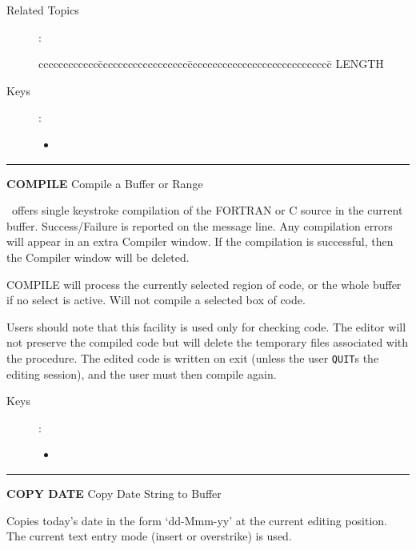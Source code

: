 \begin{description}
\item[Related Topics]:
\begin{tabbing}
cccccccccccc\=cccccccccccccccccc\=ccccccccccccccccccccccccccccc\=\kill
 \> LENGTH \\
\end{tabbing}

\item[Keys]:
           \begin{itemize}
           \item \gold\ 
           \end{itemize}
\end{description}

\goodbreak

\rule{\textwidth}{0.3mm}

{\Large {\bf COMPILE} \hfill Compile a Buffer or Range}

\medskip
  \STEve\ offers single keystroke compilation of the FORTRAN or C source
  in the current buffer. Success/Failure is reported on the message
  line. Any compilation errors will appear in an extra Compiler
  window. If the compilation is successful, then the Compiler
  window will be deleted.

  COMPILE will process the currently selected region of code, or the
  whole buffer if no select is active. Will not compile a selected box
  of code.

  Users should note that this facility is used only for checking code. The
  editor will not preserve the compiled code but will delete the temporary
  files associated with the procedure. The edited code is written
  on exit (unless the user {\tt QUIT}s the editing session), and the user
  must then compile again.

\begin{description}
\item[Keys]:
          \begin{itemize}
          \item {}\ 
          \end{itemize}
\end{description}

\goodbreak

\rule{\textwidth}{0.3mm}

{\Large {\bf COPY DATE} \hfill Copy Date String to Buffer}

\medskip
  Copies today's date in the form `dd-Mmm-yy' at the current editing
  position. The current text entry mode (insert or overstrike) is used.

